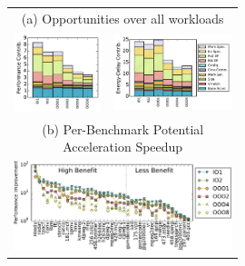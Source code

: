 \begin{figure}
\begin{center}
\footnotesize
\def\arraystretch{0.02}
\setlength{\tabcolsep}{0.1em}

\begin{tabular}{m{0.26\linewidth}m{0.34\linewidth}}
\multicolumn{2}{c}{(a) Opportunities over all workloads}\\
\includegraphics[width=0.99\linewidth]{figs/opportunities-Performance-normal.pdf} &
\includegraphics[width=0.99\linewidth]{figs/opportunities-Energy-Delay-normal.pdf} \\

\multicolumn{2}{c}{(b) Per-Benchmark Potential Acceleration Speedup}\\
\multicolumn{2}{c}{\includegraphics[width=0.6\linewidth]{figs/bench_opportunity9.pdf}} \\


\end{tabular}
\end{center}
\end{figure}
